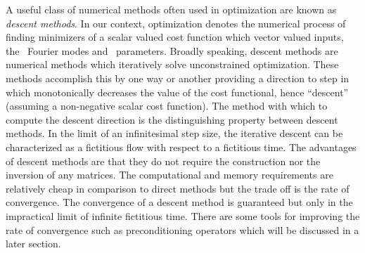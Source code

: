 
A useful class of numerical methods often used in optimization are known
as \textit{descent methods}. In our context, optimization denotes the numerical process
of finding minimizers of a scalar valued cost function which vector valued inputs, the \spt\
Fourier modes and \spt\ parameters. Broadly speaking, descent methods are numerical methods
which iteratively solve unconstrained optimization. These methods accomplish this by one
way or another providing a direction to step in which monotonically decreases the value of
the cost functional, hence ``descent'' (assuming a non-negative scalar cost function).
The method with which to compute the descent direction is the distinguishing property
between descent methods. In the limit of an infinitesimal step size, the iterative descent
can be characterized as a fictitious flow with respect to a fictitious time\rf{LCC06}.
The advantages of descent methods are that they do not require the construction nor
the inversion of any matrices. The computational and memory requirements
are relatively cheap in comparison to direct methods but the trade off is the
rate of convergence. The convergence of a descent method
is guaranteed but only in the impractical limit of infinite fictitious time.
There are some tools for improving the rate of convergence such as preconditioning
operators which will be discussed in a later section.


